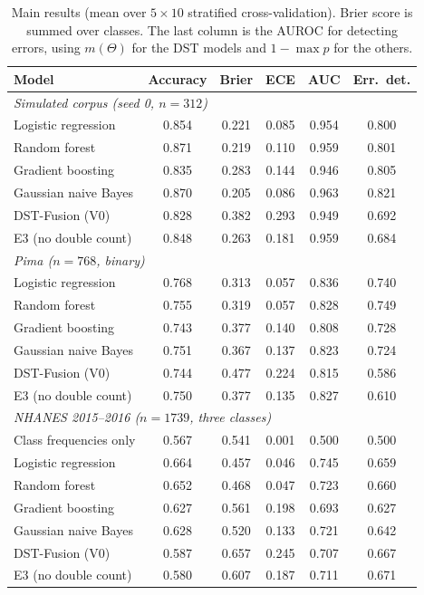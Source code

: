 \begin{table}[!ht]\centering\small
\caption{Main results (mean over $5\times10$ stratified cross-validation). Brier score is summed over classes. The last column is the AUROC for detecting errors, using $m(\Theta)$ for the DST models and $1-\max p$ for the others.}\label{tab:main}
\begin{tabular}{lccccc}\hline
Model & Accuracy & Brier & ECE & AUC & Err.\ det.\\\hline
\multicolumn{6}{l}{\textit{Simulated corpus (seed 0, $n=312$)}}\\
Logistic regression & 0.854 & 0.221 & 0.085 & 0.954 & 0.800 \\
Random forest & 0.871 & 0.219 & 0.110 & 0.959 & 0.801 \\
Gradient boosting & 0.835 & 0.283 & 0.144 & 0.946 & 0.805 \\
Gaussian naive Bayes & 0.870 & 0.205 & 0.086 & 0.963 & 0.821 \\
DST-Fusion (V0) & 0.828 & 0.382 & 0.293 & 0.949 & 0.692 \\
E3 (no double count) & 0.848 & 0.263 & 0.181 & 0.959 & 0.684 \\
\multicolumn{6}{l}{\textit{Pima ($n=768$, binary)}}\\
Logistic regression & 0.768 & 0.313 & 0.057 & 0.836 & 0.740 \\
Random forest & 0.755 & 0.319 & 0.057 & 0.828 & 0.749 \\
Gradient boosting & 0.743 & 0.377 & 0.140 & 0.808 & 0.728 \\
Gaussian naive Bayes & 0.751 & 0.367 & 0.137 & 0.823 & 0.724 \\
DST-Fusion (V0) & 0.744 & 0.477 & 0.224 & 0.815 & 0.586 \\
E3 (no double count) & 0.750 & 0.377 & 0.135 & 0.827 & 0.610 \\
\multicolumn{6}{l}{\textit{NHANES 2015--2016 ($n=1739$, three classes)}}\\
Class frequencies only & 0.567 & 0.541 & 0.001 & 0.500 & 0.500 \\
Logistic regression & 0.664 & 0.457 & 0.046 & 0.745 & 0.659 \\
Random forest & 0.652 & 0.468 & 0.047 & 0.723 & 0.660 \\
Gradient boosting & 0.627 & 0.561 & 0.198 & 0.693 & 0.627 \\
Gaussian naive Bayes & 0.628 & 0.520 & 0.133 & 0.721 & 0.642 \\
DST-Fusion (V0) & 0.587 & 0.657 & 0.245 & 0.707 & 0.667 \\
E3 (no double count) & 0.580 & 0.607 & 0.187 & 0.711 & 0.671 \\
\hline\end{tabular}
\end{table}
